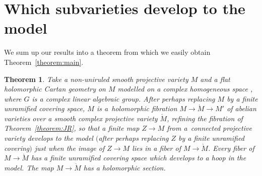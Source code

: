 \documentclass[11pt]{article}
\numberwithin{equation}{section}
\numberwithin{equation}{section}
\newtheorem{Theorem}{Theorem}[section]
\begin{document}
\section{Which subvarieties develop to the model}
We sum up our results into a theorem from which we easily obtain Theorem~\ref{theorem:main}.
\begin{Theorem}\label{theorem:big.1}
Take a non-uniruled smooth projective variety $M$ and a flat holomorphic Cartan geometry on $M$ modelled on a complex homogeneous space , where $G$ is a complex linear algebraic group.
After perhaps replacing $M$ by a finite unramified covering space, $M$ is a~holomorphic fibration $M \to \grave{M}
 \longrightarrow
 M'$ of abelian varieties over a smooth complex projective variety $\grave{M}$, refining the fibration of Theorem~{\rm\ref{theorem:JR}}, so that a finite map $Z \longrightarrow
 M$ from a~connected projective variety develops to the model $($after perhaps replacing $Z$ by a finite unramified covering$)$ just when the image of $Z \longrightarrow
 M$ lies in a fiber of $M \longrightarrow \grave{M}$.
Every fiber of~${M \to \grave{M}}$ has a finite unramified covering space which develops to a hoop in the model.
The map $M \to \grave{M}$ has a holomorphic section.
\end{Theorem}
\end{document}

